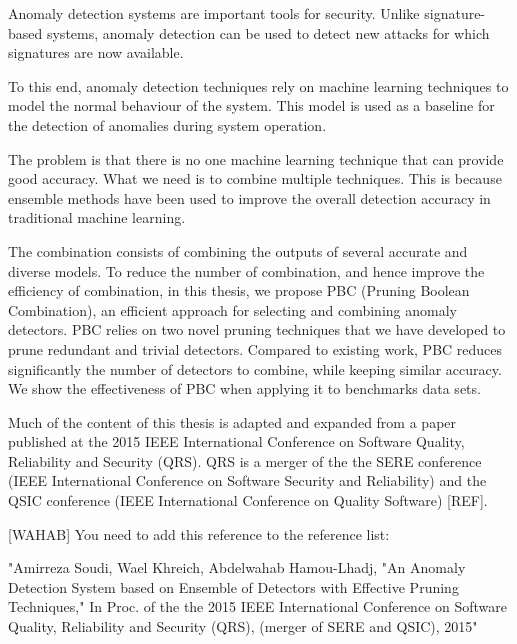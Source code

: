 Anomaly detection systems are important tools for security. Unlike signature-based systems, anomaly detection can be used to detect new attacks for which signatures are now available.

To this end, anomaly detection techniques rely on machine learning techniques to model the normal behaviour of the system. This model is used as a baseline for the detection of anomalies during system operation.

The problem is that there is no one machine learning technique that can provide good accuracy. What we need is to combine multiple techniques. This is because ensemble methods have been used to improve the overall detection accuracy in traditional machine learning. 

The combination consists of combining the outputs of several accurate and diverse models. To reduce the number of combination, and hence improve the efficiency of combination, in this thesis, we propose PBC (Pruning Boolean Combination), an efficient approach for selecting and combining anomaly detectors. PBC relies on two novel pruning techniques that we have developed to  prune redundant and trivial detectors. Compared to existing work, PBC reduces significantly the number of detectors to combine, while keeping similar accuracy. We show the effectiveness of PBC when applying it to benchmarks data sets.

Much of the content of this thesis is adapted and expanded from a paper published at the 2015 IEEE International Conference on Software Quality, Reliability and Security (QRS). QRS is a merger of the the SERE conference (IEEE International Conference on Software Security and Reliability) and the QSIC conference (IEEE International Conference on Quality Software) [REF]. 

[WAHAB] You need to add this reference to the reference list:

"Amirreza Soudi, Wael Khreich, Abdelwahab Hamou-Lhadj, "An Anomaly Detection System based on Ensemble of Detectors with Effective Pruning Techniques,"  In Proc. of the the 2015 IEEE International Conference on Software Quality, Reliability and Security (QRS), (merger of SERE and QSIC), 2015"